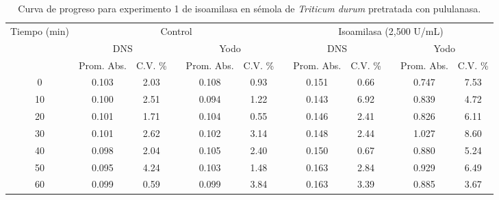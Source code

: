 \documentclass{article}
\begin{document}
\begin{table}[H]
	\centering
	\caption{Curva de progreso para experimento 1 de isoamilasa en sémola de \textit{Triticum durum} pretratada con pululanasa.}
		\begin{adjustbox}{width=\textwidth}
	\begin{tabular}{cccccccccccc}
		\toprule
		\multicolumn{1}{c}{\multirow{3}[6]{*}{Tiempo (min)}} & \multicolumn{5}{c}{Control}           &       & \multicolumn{5}{c}{Isoamilasa (2,500 U/mL)} \\
		\cmidrule{2-6}\cmidrule{8-12}          & \multicolumn{2}{c}{DNS} &       & \multicolumn{2}{c}{Yodo} &       & \multicolumn{2}{c}{DNS} &       & \multicolumn{2}{c}{Yodo} \\
		\cmidrule{2-3}\cmidrule{5-6}\cmidrule{8-9}\cmidrule{11-12}          & Prom. Abs. & C.V. \% &       & Prom. Abs. & C.V. \% &       & Prom. Abs. & C.V. \% &       & Prom. Abs. & C.V. \% \\
		\midrule
		0     & 0.103 & 2.03  &       & 0.108 & 0.93  &       & 0.151 & 0.66  &       & 0.747 & 7.53 \\
		10    & 0.100 & 2.51  &       & 0.094 & 1.22  &       & 0.143 & 6.92  &       & 0.839 & 4.72 \\
		20    & 0.101 & 1.71  &       & 0.104 & 0.55  &       & 0.146 & 2.41  &       & 0.826 & 6.11 \\
		30    & 0.101 & 2.62  &       & 0.102 & 3.14  &       & 0.148 & 2.44  &       & 1.027 & 8.60 \\
		40    & 0.098 & 2.04  &       & 0.105 & 2.40  &       & 0.150 & 0.67  &       & 0.880 & 5.24 \\
		50    & 0.095 & 4.24  &       & 0.103 & 1.48  &       & 0.163 & 2.84  &       & 0.929 & 6.49 \\
		60    & 0.099 & 0.59  &       & 0.099 & 3.84  &       & 0.163 & 3.39  &       & 0.885 & 3.67 \\
		\bottomrule
	\end{tabular}%
	\end{adjustbox}
	\label{tab:e1.2}%
\end{table}%

\end{document}
